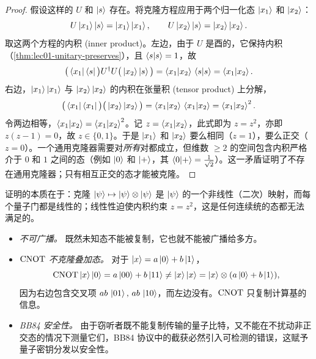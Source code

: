 \begin{proof}
假设这样的 $U$ 和 $\ket{s}$ 存在。将克隆方程应用于两个归一化态 $\ket{x_{1}}$ 和 $\ket{x_{2}}$：
\[
  U\ket{x_{1}}\ket{s}=\ket{x_{1}}\ket{x_{1}},\qquad
  U\ket{x_{2}}\ket{s}=\ket{x_{2}}\ket{x_{2}}.
\]
取这两个方程的内积 (inner product)。左边，由于 $U$ 是酉的，它保持内积（\cref{thm:lec01-unitary-preserves}），且 $\braket{s|s}=1$，故
\[
  \big(\bra{x_{1}}\bra{s}\big)U^{\dagger} U\big(\ket{x_{2}}\ket{s}\big)
   = \braket{x_{1}|x_{2}}\,\braket{s|s}
   = \braket{x_{1}|x_{2}}.
\]
右边，$\ket{x_{1}}\ket{x_{1}}$ 与 $\ket{x_{2}}\ket{x_{2}}$ 的内积在张量积 (tensor product) 上分解，
\[
  \big(\bra{x_{1}}\bra{x_{1}}\big)\big(\ket{x_{2}}\ket{x_{2}}\big)
   = \braket{x_{1}|x_{2}}\,\braket{x_{1}|x_{2}}
   = \braket{x_{1}|x_{2}}^{2}.
\]
令两边相等，$\braket{x_{1}|x_{2}} = \braket{x_{1}|x_{2}}^{2}$。记 $z=\braket{x_{1}|x_{2}}$，此式即为 $z=z^{2}$，亦即 $z(z-1)=0$，故 $z\in\{0,1\}$。于是 $\ket{x_{1}}$ 和 $\ket{x_{2}}$ 要么相同（$z=1$），要么正交（$z=0$）。一个通用克隆器需要对\emph{所有}对都成立，但维数 $\geq 2$ 的空间包含内积严格介于 $0$ 和 $1$ 之间的态（例如 $\ket{0}$ 和 $\ket{+}$，其 $\braket{0|+}=\tfrac{1}{\sqrt2}$）。这一矛盾证明了不存在通用克隆器；只有相互正交的态才能被克隆。
\end{proof}

证明的本质在于：克隆 $\ket{\psi}\mapsto\ket{\psi}\otimes\ket{\psi}$ 是 $\ket{\psi}$ 的一个非线性（二次）映射，而每个量子门都是线性的；线性性迫使内积约束 $z=z^{2}$，这是任何连续统的态都无法满足的。

\begin{remark}[若干推论]\leavevmode
\begin{itemize}[nosep]
  \item \emph{不可广播。} 既然未知态不能被复制，它也就不能被广播给多方。
  \item \emph{$\mathrm{CNOT}$ 不克隆叠加态。} 对于 $\ket{x}=a\ket{0}+b\ket{1}$，
        \[
          \mathrm{CNOT}\ket{x}\ket{0}=a\ket{00}+b\ket{11}\neq\ket{x}\ket{x}
          =\ket{x}\otimes(a\ket{0}+b\ket{1}),
        \]
        因为右边包含交叉项 $ab\,\ket{01},\,ab\,\ket{10}$，而左边没有。$\mathrm{CNOT}$ 只复制计算基的信息。
  \item \emph{BB84 安全性。} 由于窃听者既不能复制传输的量子比特，又不能在不扰动非正交态的情况下测量它们，BB84 协议中的截获必然引入可检测的错误，这赋予量子密钥分发以安全性。
\end{itemize}
\end{remark}


